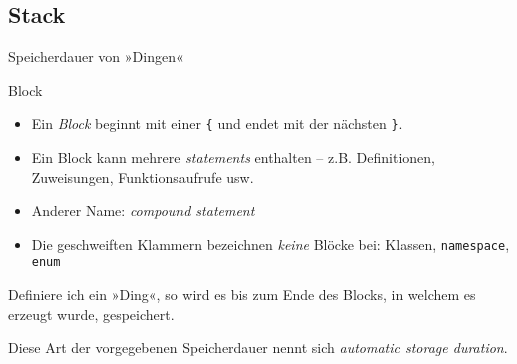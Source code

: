 \subsection{Stack}

\newcommand{\stackframe}[3]{
	\begin{frame}[t]{#1}
		\begin{columns}
			\column[t]{0.25\textwidth}
				\ifthenelse{ \equal{#2}{\empty} }{}
				{
					\texttt{[image: images/\#2]}
				}
			
			\column[t]{0.75\textwidth}
				\begin{block}{}
					#3
				\end{block}
		\end{columns}
	\end{frame}
}



\begin{frame}[fragile]{Speicherdauer von »Dingen«}
	\begin{block}{Block}
		\begin{itemize}
			\item Ein \emph{Block} beginnt mit einer \verb|{| und endet mit der nächsten \verb|}|.
			\item {\footnotesize Ein Block kann mehrere \emph{statements} enthalten -- z.B. Definitionen, Zuweisungen, Funktionsaufrufe usw.}
			\item {\footnotesize Anderer Name: \emph{compound statement}}
			\item {\footnotesize Die geschweiften Klammern bezeichnen \emph{keine} Blöcke bei: Klassen, \verb|namespace|, \verb|enum|}
		\end{itemize}
	\end{block}
	
	\pause
	\vspace{1em}
	
	Definiere ich ein »Ding«, so wird es bis zum Ende des Blocks, in welchem es erzeugt wurde, gespeichert.
	
	\vspace{0.5em}
	
	Diese Art der vorgegebenen Speicherdauer nennt sich \emph{automatic storage duration}.
\end{frame}

